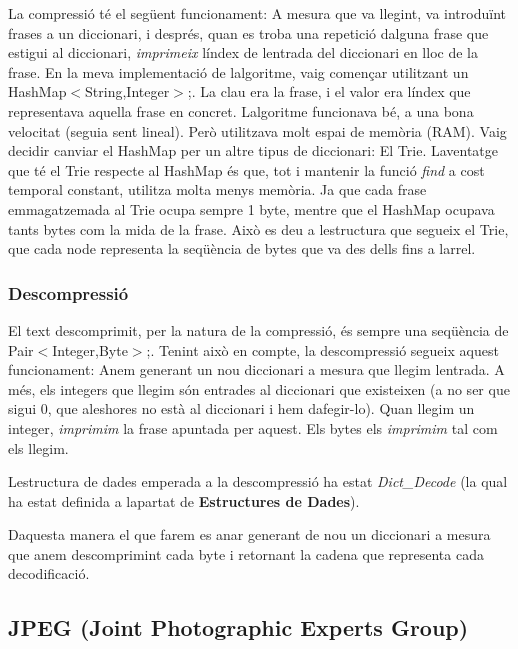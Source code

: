 La compressió té el següent funcionament\+: A mesura que va llegint, va introduïnt frases a un diccionari, i després, quan es troba una repetició d\textquotesingle{}alguna frase que estigui al diccionari, {\itshape imprimeix} l\textquotesingle{}índex de l\textquotesingle{}entrada del diccionari en lloc de la frase. En la meva implementació de l\textquotesingle{}algoritme, vaig començar utilitzant un Hash\+Map$<$\+String,\+Integer$>$;. La clau era la frase, i el valor era l\textquotesingle{}índex que representava aquella frase en concret. L\textquotesingle{}algoritme funcionava bé, a una bona velocitat (seguia sent lineal). Però utilitzava molt espai de memòria (R\+AM). Vaig decidir canviar el Hash\+Map per un altre tipus de diccionari\+: El Trie. L\textquotesingle{}aventatge que té el Trie respecte al Hash\+Map és que, tot i mantenir la funció {\itshape find} a cost temporal constant, utilitza molta menys memòria. Ja que cada frase emmagatzemada al Trie ocupa sempre 1 byte, mentre que el Hash\+Map ocupava tants bytes com la mida de la frase. Això es deu a l\textquotesingle{}estructura que segueix el Trie, que cada node representa la seqüència de bytes que va des d\textquotesingle{}ells fins a l\textquotesingle{}arrel.

\subsubsection*{Descompressió}

El text descomprimit, per la natura de la compressió, és sempre una seqüència de Pair$<$\+Integer,\+Byte$>$;. Tenint això en compte, la descompressió segueix aquest funcionament\+: Anem generant un nou diccionari a mesura que llegim l\textquotesingle{}entrada. A més, els integers que llegim són entrades al diccionari que existeixen (a no ser que sigui 0, que aleshores no està al diccionari i hem d\textquotesingle{}afegir-\/lo). Quan llegim un integer, {\itshape imprimim} la frase apuntada per aquest. Els bytes els {\itshape imprimim} tal com els llegim.

L\textquotesingle{}estructura de dades emperada a la descompressió ha estat {\itshape Dict\+\_\+\+Decode} (la qual ha estat definida a l\textquotesingle{}apartat de {\bfseries Estructures de Dades}).

D\textquotesingle{}aquesta manera el que farem es anar generant de nou un diccionari a mesura que anem descomprimint cada byte i retornant la cadena que representa cada decodificació.

\subsection*{J\+P\+EG (Joint Photographic Experts Group)}

